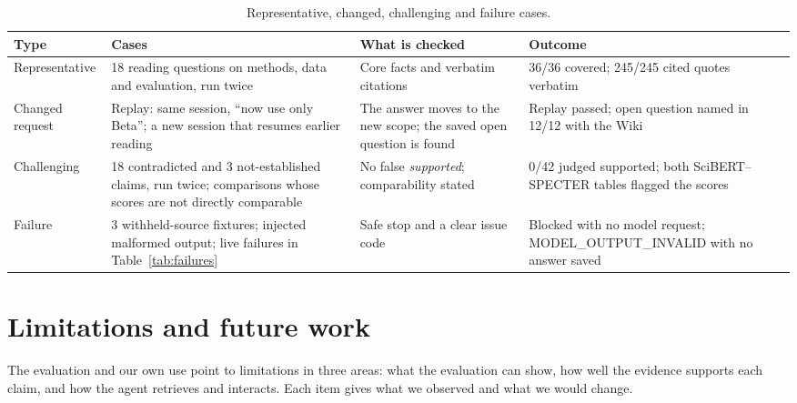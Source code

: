 \documentclass{article}
\newcommand{\code}[1]{{\ttfamily\small\hyphenchar\font=-1\relax #1}}
\begin{document}
\begin{table}[H]
  \caption{Representative, changed, challenging and failure cases.}
  \label{tab:cases}
  \small
  \begin{tabularx}{\linewidth}{@{}P{2.1cm}YYY@{}}
    \toprule
    Type & Cases & What is checked & Outcome \\
    \midrule
    Representative & 18 reading questions on methods, data and evaluation, run twice & Core facts and verbatim citations & 36/36 covered; 245/245 cited quotes verbatim \\ \addlinespace[4pt]
    Changed request & Replay: same session, ``now use only Beta''; a new session that resumes earlier reading & The answer moves to the new scope; the saved open question is found & Replay passed; open question named in 12/12 with the Wiki \\ \addlinespace[4pt]
    Challenging & 18 contradicted and 3 not-established claims, run twice; comparisons whose scores are not directly comparable & No false \emph{supported}; comparability stated & 0/42 judged supported; both SciBERT--SPECTER tables flagged the scores \\ \addlinespace[4pt]
    Failure & 3 withheld-source fixtures; injected malformed output; live failures in Table~\ref{tab:failures} & Safe stop and a clear issue code & Blocked with no model request; \code{MODEL\_OUTPUT\_INVALID} with no answer saved \\
    \bottomrule
  \end{tabularx}
\end{table}

\section{Limitations and future work}
\label{sec:limits}
The evaluation and our own use point to limitations in three areas: what the evaluation can show, how
well the evidence supports each claim, and how the agent retrieves and interacts. Each item gives what
we observed and what we would change.
\end{document}
